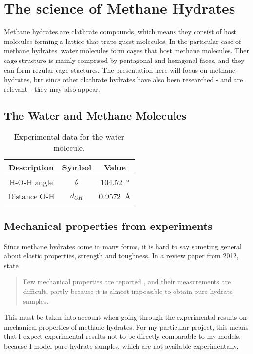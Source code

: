 \chapter{The science of Methane Hydrates}
Methane hydrates are clathrate compounds, which means they consist of host molecules forming a lattice that traps guest molecules. In the particular case of methane hydrates, water molecules form cages that host methane molecules. Ther cage structure is mainly comprised by pentagonal and hexagonal faces, and they can form regular cage stuctures. The presentation here will focus on methane hydrates, but since other clathrate hydrates have also been researched - and are relevant - they may also appear.



\section{The Water and Methane Molecules}
\begin{table}[h!tb]
\caption{Experimental data for the water molecule.}
\label{tb:intro:h2odata}
\begin{center}
\begin{tabular}{c|c|c}
Description & Symbol & Value \\
\hline
H-O-H angle & $\theta$ & \SI{104.52}{\degree} \\
Distance O-H & $d_{OH}$ & \SI{0.9572}{\angstrom} \\
\end{tabular}
\end{center}
\end{table}


\section{Mechanical properties from experiments}
Since methane hydrates come in many forms, it is hard to say someting general about elastic properties, strength and toughness. In a review paper from 2012, \citet{Ning2012} state:
\begin{quotation}
Few mechanical properties are reported , and their measurements are difficult, partly because it is almost impossible to obtain pure hydrate samples.
\end{quotation}

This must be taken into account when going through the experimental results on mechanical properties of methane hydrates. For my particular project, this means that I expect experimental results not to be directly comparable to my models, because I model pure hydrate samples, which are not available experimentally. 

